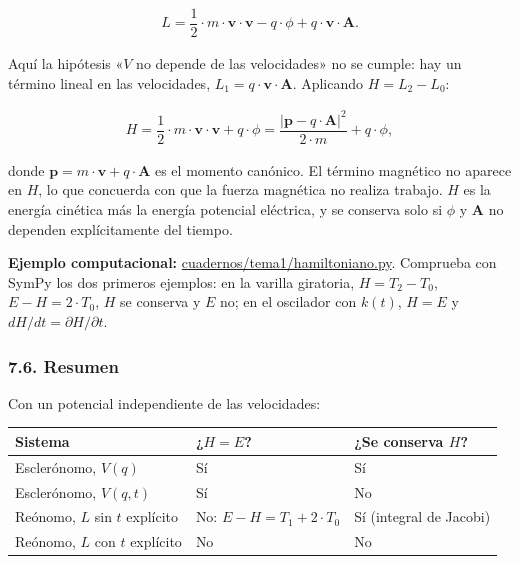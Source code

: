 \documentclass[
  spanish,
]{article}
\newcounter{none} %
\begin{document}
\[
\begin{aligned}
L = \dfrac{1}{2} \cdot m \cdot \mathbf{v} \cdot \mathbf{v} - q \cdot \phi + q \cdot \mathbf{v} \cdot \mathbf{A}.
\end{aligned}
\]

Aquí la hipótesis «\(V\) no depende de las velocidades» no se cumple:
hay un término lineal en las velocidades,
\(L_1 = q \cdot \mathbf{v} \cdot \mathbf{A}\). Aplicando
\(H = L_2 - L_0\):

\[
\begin{aligned}
H = \dfrac{1}{2} \cdot m \cdot \mathbf{v} \cdot \mathbf{v} + q \cdot \phi = \dfrac{\left|\mathbf{p} - q \cdot \mathbf{A}\right|^2}{2 \cdot m} + q \cdot \phi,
\end{aligned}
\]

donde \(\mathbf{p} = m \cdot \mathbf{v} + q \cdot \mathbf{A}\) es el
momento canónico. El término magnético no aparece en \(H\), lo que
concuerda con que la fuerza magnética no realiza trabajo. \(H\) es la
energía cinética más la energía potencial eléctrica, y se conserva solo
si \(\phi\) y \(\mathbf{A}\) no dependen explícitamente del tiempo.

\textbf{Ejemplo computacional:}
\href{https://github.com/julian1c2a/MCC/blob/main/cuadernos/tema1/hamiltoniano.py}{cuadernos/tema1/hamiltoniano.py}.
Comprueba con SymPy los dos primeros ejemplos: en la varilla giratoria,
\(H = T_2 - T_0\), \(E - H = 2 \cdot T_0\), \(H\) se conserva y \(E\)
no; en el oscilador con \(k(t)\), \(H = E\) y
\(dH/dt = \partial H/\partial t\).

\subsubsection{7.6. Resumen}\label{resumen}

Con un potencial independiente de las velocidades:

{\def\LTcaptype{none} %
\begin{longtable}[]{@{}
  >{\raggedright\arraybackslash}p{}
  >{\raggedright\arraybackslash}p{}
  >{\raggedright\arraybackslash}p{}@{}}
\toprule\noalign{}
\begin{minipage}[b]{\linewidth}\raggedright
Sistema
\end{minipage} & \begin{minipage}[b]{\linewidth}\raggedright
¿\(H = E\)?
\end{minipage} & \begin{minipage}[b]{\linewidth}\raggedright
¿Se conserva \(H\)?
\end{minipage} \\
\midrule\noalign{}
\endhead
\bottomrule\noalign{}
\endlastfoot
Esclerónomo, \(V(q)\) & Sí & Sí \\
Esclerónomo, \(V(q,t)\) & Sí & No \\
Reónomo, \(L\) sin \(t\) explícito & No: \(E - H = T_1 + 2 \cdot T_0\) &
Sí (integral de Jacobi) \\
Reónomo, \(L\) con \(t\) explícito & No & No \\
\end{longtable}
}
\end{document}
